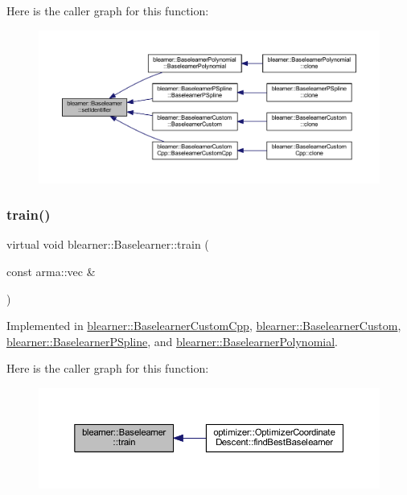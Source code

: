 Here is the caller graph for this function\+:\nopagebreak
\begin{figure}[H]
\begin{center}
\leavevmode
\includegraphics[width=350pt]{classblearner_1_1_baselearner_a6669906a481cbdd516dce8df6f6e5b76_icgraph}
\end{center}
\end{figure}
\mbox{\label{classblearner_1_1_baselearner_a40e03ad070b9a03aae706d9ee8094b80}} 
\subsubsection{\texorpdfstring{train()}{train()}}
{\footnotesize\ttfamily virtual void blearner\+::\+Baselearner\+::train (\begin{DoxyParamCaption}\item[{const arma\+::vec \&}]{ }\end{DoxyParamCaption})\hspace{0.3cm}{\ttfamily [pure virtual]}}



Implemented in \mbox{\hyperlink{classblearner_1_1_baselearner_custom_cpp_a7437b1175498b928d3202b586527d2c4}{blearner\+::\+Baselearner\+Custom\+Cpp}}, \mbox{\hyperlink{classblearner_1_1_baselearner_custom_a31e3921f86f267d36135d07bf1d16551}{blearner\+::\+Baselearner\+Custom}}, \mbox{\hyperlink{classblearner_1_1_baselearner_p_spline_a48935f40abc8b393b674c39f4efcff25}{blearner\+::\+Baselearner\+P\+Spline}}, and \mbox{\hyperlink{classblearner_1_1_baselearner_polynomial_af8bc28904ebce13e78d0e4a361725f26}{blearner\+::\+Baselearner\+Polynomial}}.

Here is the caller graph for this function\+:\nopagebreak
\begin{figure}[H]
\begin{center}
\leavevmode
\includegraphics[width=350pt]{classblearner_1_1_baselearner_a40e03ad070b9a03aae706d9ee8094b80_icgraph}
\end{center}
\end{figure}


